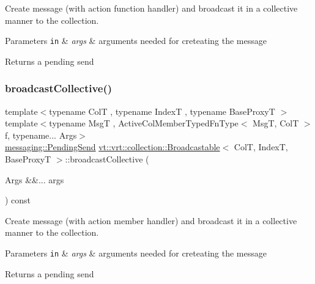 Create message (with action function handler) and broadcast it in a collective manner to the collection. 


\begin{DoxyParams}[1]{Parameters}
\mbox{\tt in}  & {\em args} & arguments needed for creteating the message\\
\hline
\end{DoxyParams}
\begin{DoxyReturn}{Returns}
a pending send 
\end{DoxyReturn}
\mbox{\label{structvt_1_1vrt_1_1collection_1_1_broadcastable_acef03dd57082f32556bef0e536a07fe9}} 
\subsubsection{\texorpdfstring{broadcast\+Collective()}{broadcastCollective()}\hspace{0.1cm}{\footnotesize\ttfamily [2/3]}}
{\footnotesize\ttfamily template$<$typename ColT , typename IndexT , typename Base\+ProxyT $>$ \\
template$<$typename MsgT , Active\+Col\+Member\+Typed\+Fn\+Type$<$ Msg\+T, Col\+T $>$ f, typename... Args$>$ \\
\hyperlink{structvt_1_1messaging_1_1_pending_send}{messaging\+::\+Pending\+Send} \hyperlink{structvt_1_1vrt_1_1collection_1_1_broadcastable}{vt\+::vrt\+::collection\+::\+Broadcastable}$<$ ColT, IndexT, Base\+ProxyT $>$\+::broadcast\+Collective (\begin{DoxyParamCaption}\item[{Args \&\&...}]{args }\end{DoxyParamCaption}) const}



Create message (with action member handler) and broadcast it in a collective manner to the collection. 


\begin{DoxyParams}[1]{Parameters}
\mbox{\tt in}  & {\em args} & arguments needed for creteating the message\\
\hline
\end{DoxyParams}
\begin{DoxyReturn}{Returns}
a pending send 
\end{DoxyReturn}
\mbox{\label{structvt_1_1vrt_1_1collection_1_1_broadcastable_ab04bb88a6120f3032a9af4aa173dabb5}} 
